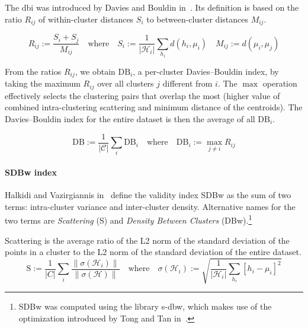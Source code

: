 The \acrfull{dbi} was introduced by Davies and Bouldin in~\cite{AClusterSeparDavies1979}. Its definition is based on the ratio $R_{ij}$ of within-cluster distances $S_i$ to between-cluster distances $M_{ij}$.

\begin{equation*}
  R_{ij} := \frac{S_i + S_j}{M_{ij}}
  \quad \textrm{where} \quad
  S_i := \frac{1}{|\mathcal{H}_i|} \sum_{h_i} d(h_i, \mu_i) \quad
  M_{ij} := d(\mu_i, \mu_j)
\end{equation*}

From the ratios $R_{ij}$, we obtain $\textrm{DB}_i$, a per-cluster Davies–Bouldin index, by taking the maximum $R_{ij}$ over all clusters $j$ different from $i$. The $\max$ operation effectively selects the clustering pairs that overlap the most (higher value of combined intra-clustering scattering and minimum distance of the centroids). The Davies–Bouldin index for the entire dataset is then the average of all $\textrm{DB}_i$.

\begin{equation}
  \textrm{DB} := \frac{1}{|\mathcal{C}|} \sum_{i} \textrm{DB}_i
  \quad \textrm{where} \quad
  \textrm{DB}_i := \max_{j \neq i} R_{ij}
  \label{eq:bdi}
\end{equation}

\paragraph{SDBw index}
\label{par:sdbw}

Halkidi and Vazirgiannis in~\cite{ClusteringValiHalkid} define the validity index SDBw as the sum of two terms: intra-cluster variance and inter-cluster density. Alternative names for the two terms are \emph{Scattering} (S) and \emph{Density Between Clusters} (DBw).\footnote{SDBw was computed using the library s-dbw\cite{SDbwLashko2019}, which makes use of the optimization introduced by Tong and Tan in~\cite{ClusteringValiTong2009}.}

Scattering is the average ratio of the L2 norm of the standard deviation of the points in a cluster to the L2 norm of the standard deviation of the entire dataset.
\begin{equation*}
  \textrm{S} := \frac{1}{|C|} \sum_{i} \frac{\|\sigma(\mathcal{H}_i)\|}{\|\sigma(\mathcal{H})\|}
  \quad \textrm{where} \quad
  \sigma(\mathcal{H}_i) := \sqrt{\frac{1}{|\mathcal{H}_i|} \sum_{h_i} \left[h_i - \mu_i \right]^{2}}
\end{equation*}

